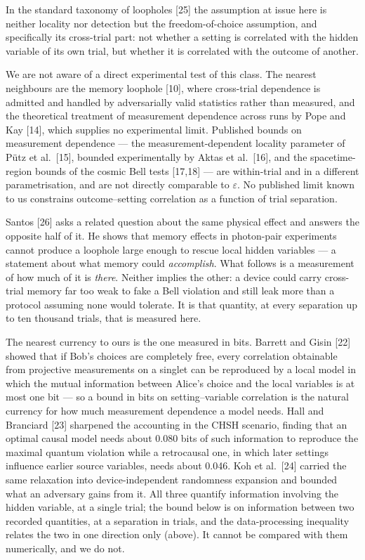 \documentclass[
  11pt,
]{article}
\newcounter{none} %
\begin{document}
In the standard taxonomy of loopholes {[}25{]} the assumption at issue
here is neither locality nor detection but the freedom-of-choice
assumption, and specifically its cross-trial part: not whether a setting
is correlated with the hidden variable of its own trial, but whether it
is correlated with the outcome of another.

We are not aware of a direct experimental test of this class. The
nearest neighbours are the memory loophole {[}10{]}, where cross-trial
dependence is admitted and handled by adversarially valid statistics
rather than measured, and the theoretical treatment of measurement
dependence across runs by Pope and Kay {[}14{]}, which supplies no
experimental limit. Published bounds on measurement dependence --- the
measurement-dependent locality parameter of Pütz et al.~{[}15{]},
bounded experimentally by Aktas et al.~{[}16{]}, and the
spacetime-region bounds of the cosmic Bell tests {[}17,18{]} --- are
within-trial and in a different parametrisation, and are not directly
comparable to \(\varepsilon\). No published limit known to us constrains
outcome--setting correlation as a function of trial separation.

Santos {[}26{]} asks a related question about the same physical effect
and answers the opposite half of it. He shows that memory effects in
photon-pair experiments cannot produce a loophole large enough to rescue
local hidden variables --- a statement about what memory could
\emph{accomplish}. What follows is a measurement of how much of it is
\emph{there}. Neither implies the other: a device could carry
cross-trial memory far too weak to fake a Bell violation and still leak
more than a protocol assuming none would tolerate. It is that quantity,
at every separation up to ten thousand trials, that is measured here.

The nearest currency to ours is the one measured in bits. Barrett and
Gisin {[}22{]} showed that if Bob's choices are completely free, every
correlation obtainable from projective measurements on a singlet can be
reproduced by a local model in which the mutual information between
Alice's choice and the local variables is at most one bit --- so a bound
in bits on setting--variable correlation is the natural currency for how
much measurement dependence a model needs. Hall and Branciard {[}23{]}
sharpened the accounting in the CHSH scenario, finding that an optimal
causal model needs about 0.080 bits of such information to reproduce the
maximal quantum violation while a retrocausal one, in which later
settings influence earlier source variables, needs about 0.046. Koh et
al.~{[}24{]} carried the same relaxation into device-independent
randomness expansion and bounded what an adversary gains from it. All
three quantify information involving the hidden variable, at a single
trial; the bound below is on information between two recorded
quantities, at a separation in trials, and the data-processing
inequality relates the two in one direction only (above). It cannot be
compared with them numerically, and we do not.
\end{document}
